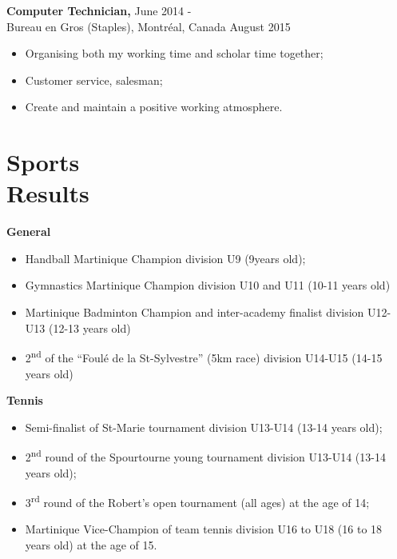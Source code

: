 \documentclass[margin]{res}
\begin{document}
\begin{resume}
    
  {\bf Computer Technician,} \hfill June 2014 -\\
  Bureau en Gros (Staples), Montr\'{e}al, Canada  \hfill August 2015
  \begin{itemize} \itemsep -2pt  %
 \item Organising both my working time and scholar time together; 
 \item Customer service, salesman;
 \item Create and maintain a positive working atmosphere.
 \end{itemize}
  

  \section{Sports \\Results}
  
  {\bf General}
  \begin{itemize} \itemsep -2pt %
  \item Handball Martinique Champion division U9 (9years old);
  \item Gymnastics Martinique Champion division U10 and U11 (10-11 years old)
  \item Martinique Badminton Champion and inter-academy finalist division U12-U13 (12-13 years old)
  \item 2\textsuperscript{nd} of the ``Foul\'e de la St-Sylvestre'' (5km race) division U14-U15 (14-15 years old)
  \end{itemize}

  {\bf Tennis}
  \begin{itemize} \itemsep -2pt %

  \item Semi-finalist of St-Marie tournament division U13-U14 (13-14 years old);
  \item 2\textsuperscript{nd} round of the Spourtourne young tournament division U13-U14 (13-14 years old);
  \item 3\textsuperscript{rd} round of the Robert’s open tournament (all ages) at the age of 14;
  \item Martinique Vice-Champion of team tennis division U16 to U18 (16 to 18 years old) at the age of 15.
  \end{itemize}


\end{resume} 
\end{document}
